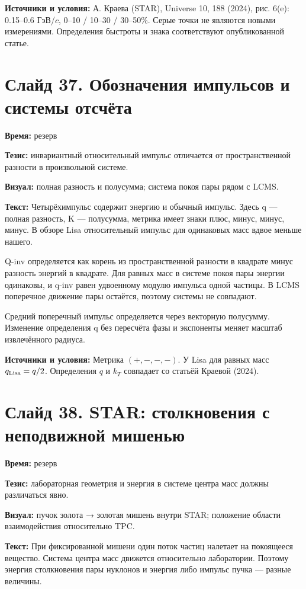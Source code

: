 \documentclass[11pt,a4paper]{article}
\begin{document}
\textbf{Источники и условия:} А. Краева (STAR), Universe 10, 188 (2024), рис. 6(e): 0.15–0.6 ГэВ/\(c\), 0–10 / 10–30 / 30–50\%. Серые точки не являются новыми измерениями. Определения быстроты и знака соответствуют опубликованной статье.

\clearpage
\section*{Слайд 37. Обозначения импульсов и системы отсчёта}
\textbf{Время:} резерв

\textbf{Тезис:} инвариантный относительный импульс отличается от пространственной разности в произвольной системе.

\textbf{Визуал:} полная разность и полусумма; система покоя пары рядом с LCMS.

\textbf{Текст:} Четырёхимпульс содержит энергию и обычный импульс. Здесь q — полная разность, K — полусумма, метрика имеет знаки плюс, минус, минус, минус. В обзоре Lisa относительный импульс для одинаковых масс вдвое меньше нашего.

Q-inv определяется как корень из пространственной разности в квадрате минус разность энергий в квадрате. Для равных масс в системе покоя пары энергии одинаковы, и q-inv равен удвоенному модулю импульса одной частицы. В LCMS поперечное движение пары остаётся, поэтому системы не совпадают.

Средний поперечный импульс определяется через векторную полусумму. Изменение определения q без пересчёта фазы и экспоненты меняет масштаб извлечённого радиуса.

\textbf{Источники и условия:} Метрика \((+,-,-,-)\). У Lisa для равных масс \(q_{\rm Lisa}=q/2\). Определения \(q\) и \(k_T\) совпадает со статьёй Краевой (2024).

\clearpage
\section*{Слайд 38. STAR: столкновения с неподвижной мишенью}
\textbf{Время:} резерв

\textbf{Тезис:} лабораторная геометрия и энергия в системе центра масс должны различаться явно.

\textbf{Визуал:} пучок золота → золотая мишень внутри STAR; положение области взаимодействия относительно TPC.

\textbf{Текст:} При фиксированной мишени один поток частиц налетает на покоящееся вещество. Система центра масс движется относительно лаборатории. Поэтому энергия столкновения пары нуклонов и энергия либо импульс пучка — разные величины.
\end{document}
